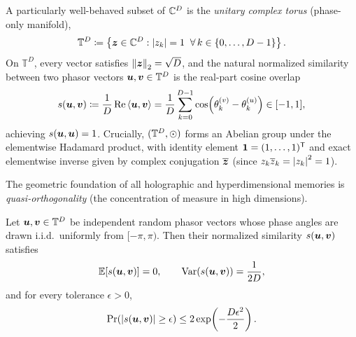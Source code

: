 A particularly well-behaved subset of $\mathbb{C}^D$ is the \emph{unitary complex torus} (phase-only manifold),
\begin{equation}\label{eq:complex_torus}
    \mathbb{T}^D \coloneqq \left\{ \boldsymbol{z} \in \mathbb{C}^D : \left\lvert z_k \right\rvert = 1 \;\; \forall\, k \in \{0, \dots, D-1\} \right\}.
\end{equation}
On $\mathbb{T}^D$, every vector satisfies $\left\lVert \boldsymbol{z} \right\rVert_2 = \sqrt{D}$, and the natural normalized similarity between two phasor vectors $\boldsymbol{u}, \boldsymbol{v} \in \mathbb{T}^D$ is the real-part cosine overlap
\begin{equation}\label{eq:phasor_similarity}
    s(\boldsymbol{u}, \boldsymbol{v}) \coloneqq \frac{1}{D}\operatorname{Re}\left\langle \boldsymbol{u}, \boldsymbol{v} \right\rangle
    = \frac{1}{D} \sum_{k=0}^{D-1} \cos\!\left(\theta_k^{(v)} - \theta_k^{(u)}\right) \in [-1, 1],
\end{equation}
achieving $s(\boldsymbol{u}, \boldsymbol{u}) = 1$.
Crucially, $(\mathbb{T}^D, \odot)$ forms an Abelian group under the elementwise Hadamard product, with identity element $\boldsymbol{1} = (1, \dots, 1)^{\mathsf{T}}$ and exact elementwise inverse given by complex conjugation $\overline{\boldsymbol{z}}$ (since $z_k \overline{z}_k = \left\lvert z_k \right\rvert^2 = 1$).

The geometric foundation of all holographic and hyperdimensional memories is \emph{quasi-orthogonality} (the concentration of measure in high dimensions).

\begin{proposition}\label{prop:quasi_ortho}
Let $\boldsymbol{u}, \boldsymbol{v} \in \mathbb{T}^D$ be independent random phasor vectors whose phase angles are drawn i.i.d.\ uniformly from $[-\pi, \pi)$.
Then their normalized similarity $s(\boldsymbol{u}, \boldsymbol{v})$ satisfies
\begin{equation}\label{eq:quasi_ortho_moments}
    \mathbb{E}\!\left[s(\boldsymbol{u}, \boldsymbol{v})\right] = 0, \qquad
    \operatorname{Var}\!\left(s(\boldsymbol{u}, \boldsymbol{v})\right) = \frac{1}{2D},
\end{equation}
and for every tolerance $\epsilon > 0$,
\begin{equation}\label{eq:hoeffding_ortho}
    \Pr\!\left(\left\lvert s(\boldsymbol{u}, \boldsymbol{v}) \right\rvert \ge \epsilon\right) \le 2 \exp\!\left(-\frac{D \epsilon^2}{2}\right).
\end{equation}
\end{proposition}

